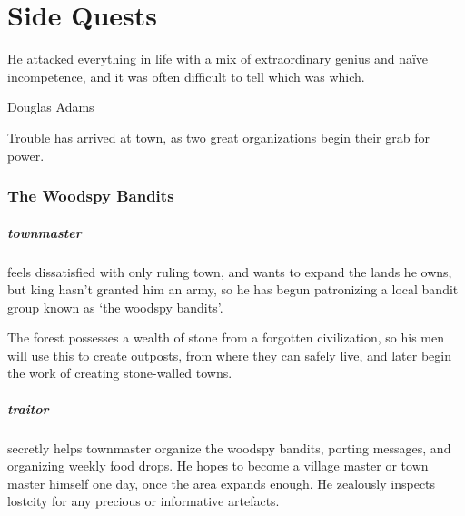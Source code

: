 \chapter{Side Quests}
  \epigraph{He attacked everything in life with a mix of extraordinary genius and na\"ive incompetence, and it was often difficult to tell which was which.}{Douglas Adams}
\label{sideQuestIntro}

\begin{multicols}{2}

\ifodd\day
  \setcounter{gold}{85}
\else
  \setcounter{gold}{35}
\fi

\label{Irina/greylands}


\noindent
Trouble has arrived at \gls{town}, as two great organizations begin their grab for power.

\subsection{The Woodspy Bandits}

\paragraph{\gls{townmaster}} feels dissatisfied with only ruling \gls{town}, and wants to expand the lands he owns, but \gls{king} hasn't granted him an army, so he has begun patronizing a local bandit group known as `the woodspy bandits'.

The forest possesses a wealth of stone from a forgotten civilization, so his men will use this to create outposts, from where they can safely live, and later begin the work of creating stone-walled towns.

\paragraph{\gls{traitor}}
secretly helps \gls{townmaster} organize the woodspy bandits, porting messages, and organizing weekly food drops.
He hopes to become a village master or town master himself one day, once the area expands enough.
He zealously inspects \gls{lostcity} for any precious or informative artefacts.


\end{multicols}
